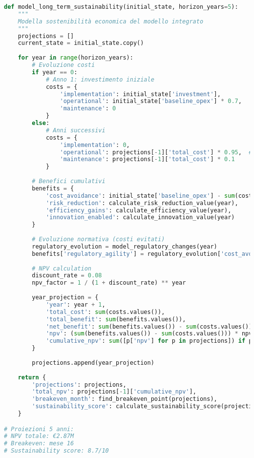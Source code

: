 \begin{lstlisting}[language=Python, caption=Modello sostenibilità compliance integrata]
def model_long_term_sustainability(initial_state, horizon_years=5):
    """
    Modella sostenibilità economica del modello integrato
    """
    projections = []
    current_state = initial_state.copy()
    
    for year in range(horizon_years):
        # Evoluzione costi
        if year == 0:
            # Anno 1: investimento iniziale
            costs = {
                'implementation': initial_state['investment'],
                'operational': initial_state['baseline_opex'] * 0.7,
                'maintenance': 0
            }
        else:
            # Anni successivi
            costs = {
                'implementation': 0,
                'operational': projections[-1]['total_cost'] * 0.95,  # efficienza crescente
                'maintenance': projections[-1]['total_cost'] * 0.1
            }
            
        # Benefici cumulativi
        benefits = {
            'cost_avoidance': initial_state['baseline_opex'] - sum(costs.values()),
            'risk_reduction': calculate_risk_reduction_value(year),
            'efficiency_gains': calculate_efficiency_value(year),
            'innovation_enabled': calculate_innovation_value(year)
        }
        
        # Evoluzione normativa (costi evitati)
        regulatory_evolution = model_regulatory_changes(year)
        benefits['regulatory_agility'] = regulatory_evolution['cost_avoided']
        
        # NPV calculation
        discount_rate = 0.08
        npv_factor = 1 / (1 + discount_rate) ** year
        
        year_projection = {
            'year': year + 1,
            'total_cost': sum(costs.values()),
            'total_benefit': sum(benefits.values()),
            'net_benefit': sum(benefits.values()) - sum(costs.values()),
            'npv': (sum(benefits.values()) - sum(costs.values())) * npv_factor,
            'cumulative_npv': sum([p['npv'] for p in projections]) if projections else 0
        }
        
        projections.append(year_projection)
        
    return {
        'projections': projections,
        'total_npv': projections[-1]['cumulative_npv'],
        'breakeven_month': find_breakeven_point(projections),
        'sustainability_score': calculate_sustainability_score(projections)
    }

# Proiezioni 5 anni:
# NPV totale: €2.87M
# Breakeven: mese 16
# Sustainability score: 8.7/10
\end{lstlisting}

